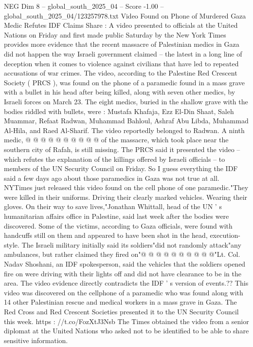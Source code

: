 \begin{textsample}{NEG Dim 8 – global\_south\_2025\_04 – Score -1.00 – global\_south\_2025\_04/123257978.txt}  \label{ex:f8_neg_048}
Video Found on Phone of Murdered Gaza Medic Refutes IDF Claims Share : A video presented to officials at the United Nations on Friday and first made public Saturday by the New York Times provides more evidence that the recent massacre of Palestinian medics in Gaza did not happen the way Israeli government claimed -- the latest in a long line of deception when it comes to violence against civilians that have led to repeated accusations of war crimes.
The video, according to the Palestine Red Crescent Society ( PRCS ), was found on the phone of a paramedic found in a mass grave with a bullet in his head after being killed, along with seven other medics, by Israeli forces on March 23.
The eight medics, buried in the shallow grave with the bodies riddled with bullets, were : Mustafa Khafaja, Ezz El-Din Shaat, Saleh Muammar, Refaat Radwan, Muhammad Bahloul, Ashraf Abu Libda, Muhammad Al-Hila, and Raed Al-Sharif.
The video reportedly belonged to Radwan.
A ninth medic, @ @ @ @ @ @ @ @ @ @ of the massacre, which took place near the southern city of Rafah, is still missing.
The PRCS said it presented the video -- which refutes the explanation of the killings offered by Israeli officials -- to members of the UN Security Council on Friday.
So I guess everything the IDF said a few days ago about those paramedics in Gaza was not true at all.
NYTimes just released this video found on the cell phone of one paramedic."They were killed in their uniforms.
Driving their clearly marked vehicles.
Wearing their gloves.
On their way to save lives,"Jonathan Whittall, head of the UN ' s humanitarian affairs office in Palestine, said last week after the bodies were discovered.
Some of the victims, according to Gaza officials, were found with handcuffs still on them and appeared to have been shot in the head, execution-style.
The Israeli military initially said its soldiers"did not randomly attack"any ambulances, but rather claimed they fired on"@ @ @ @ @ @ @ @ @ @"Lt.
Col.
Nadav Shoshani, an IDF spokesperson, said the vehicles that the soldiers opened fire on were driving with their lights off and did not have clearance to be in the area.
The video evidence directly contradicts the IDF ' s version of events.??
This video was discovered on the cellphone of a paramedic who was found along with 14 other Palestinian rescue and medical workers in a mass grave in Gaza.
The Red Cross and Red Crescent Societies presented it to the UN Security Council this week. https : //t.co/FozXtJ3Nsb The Times obtained the video from a senior diplomat at the United Nations who asked not to be identified to be able to share sensitive information.

\end{textsample}
